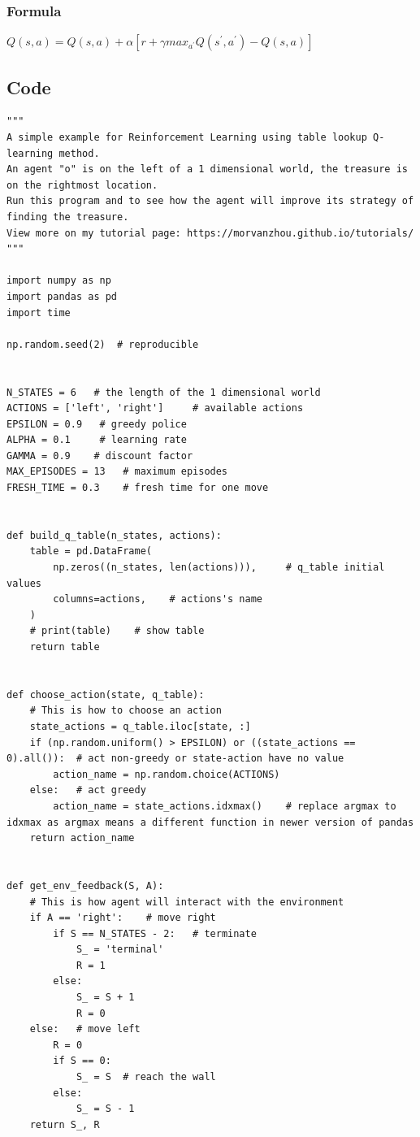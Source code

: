 \documentclass{book}
\begin{document}
\subsubsection{Formula}
$Q(s, a) =Q(s, a)+\alpha\left[r+\gamma max_{a^{\prime}} Q\left(s^{\prime}, a^{\prime}\right)-Q(s, a)\right]$
\subsection{Code}
\begin{lstlisting}
"""
A simple example for Reinforcement Learning using table lookup Q-learning method.
An agent "o" is on the left of a 1 dimensional world, the treasure is on the rightmost location.
Run this program and to see how the agent will improve its strategy of finding the treasure.
View more on my tutorial page: https://morvanzhou.github.io/tutorials/
"""

import numpy as np
import pandas as pd
import time

np.random.seed(2)  # reproducible


N_STATES = 6   # the length of the 1 dimensional world
ACTIONS = ['left', 'right']     # available actions
EPSILON = 0.9   # greedy police
ALPHA = 0.1     # learning rate
GAMMA = 0.9    # discount factor
MAX_EPISODES = 13   # maximum episodes
FRESH_TIME = 0.3    # fresh time for one move


def build_q_table(n_states, actions):
    table = pd.DataFrame(
        np.zeros((n_states, len(actions))),     # q_table initial values
        columns=actions,    # actions's name
    )
    # print(table)    # show table
    return table


def choose_action(state, q_table):
    # This is how to choose an action
    state_actions = q_table.iloc[state, :]
    if (np.random.uniform() > EPSILON) or ((state_actions == 0).all()):  # act non-greedy or state-action have no value
        action_name = np.random.choice(ACTIONS)
    else:   # act greedy
        action_name = state_actions.idxmax()    # replace argmax to idxmax as argmax means a different function in newer version of pandas
    return action_name


def get_env_feedback(S, A):
    # This is how agent will interact with the environment
    if A == 'right':    # move right
        if S == N_STATES - 2:   # terminate
            S_ = 'terminal'
            R = 1
        else:
            S_ = S + 1
            R = 0
    else:   # move left
        R = 0
        if S == 0:
            S_ = S  # reach the wall
        else:
            S_ = S - 1
    return S_, R



\end{lstlisting}
\end{document}
